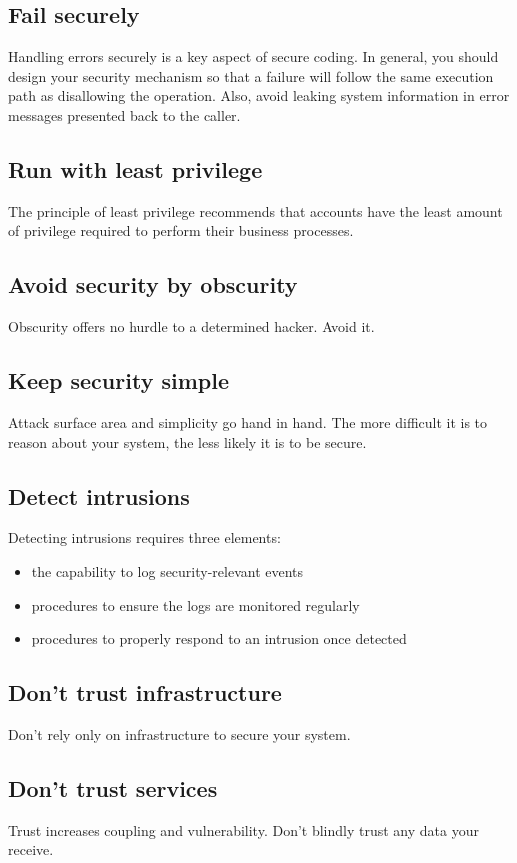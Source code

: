\documentclass[a5paper,pagesize,10pt,bibtotoc,DIV=10,twoside]{scrbook}
\begin{document}
\subsection{Fail securely}
Handling errors securely is a key aspect of secure coding. In general, you should design your security mechanism so that a failure will follow the same execution path as disallowing the operation. Also, avoid leaking system information in error messages presented back to the caller.

\subsection{Run with least privilege}
The principle of least privilege recommends that accounts have the least amount of privilege required to perform their business processes. 

\subsection{Avoid security by obscurity}
Obscurity offers no hurdle to a determined hacker. Avoid it.

\subsection{Keep security simple}
Attack surface area and simplicity go hand in hand. The more difficult it is to reason about your system, the less likely it is to be secure.

\subsection{Detect intrusions}
Detecting intrusions requires three elements:
\begin{itemize}
\item the capability to log security-relevant events
\item procedures to ensure the logs are monitored regularly
\item procedures to properly respond to an intrusion once detected
\end{itemize}

\subsection{Don't trust infrastructure}
Don't rely only on infrastructure to secure your system.

\subsection{Don't trust services}
Trust increases coupling and vulnerability. Don't blindly trust any data your receive.
\end{document}
